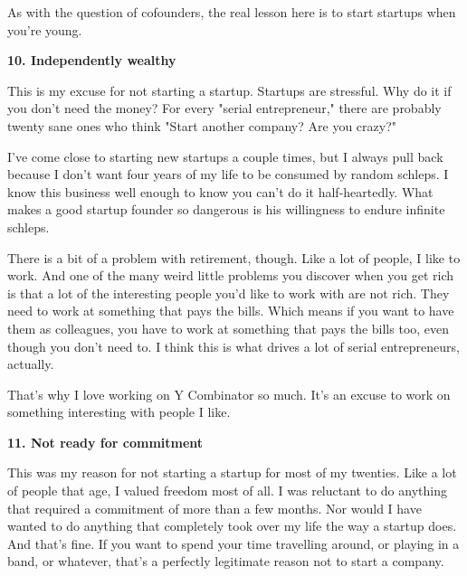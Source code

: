 As with the question of cofounders, the
                    real lesson here is to start startups when you're young.

\textbf{10. Independently wealthy}

This is my excuse for not starting a startup.
                    Startups are stressful. Why do it if you don't need the
                    money? For every "serial entrepreneur," there are probably
                    twenty sane ones who think "Start another company? Are you
                    crazy?"

I've come close to starting new startups
                    a couple times, but I always pull back because I don't want
                    four years of my life to be consumed by random schleps. I
                    know this business well enough to know you can't do it
                    half-heartedly. What makes a good startup founder so
                    dangerous is his willingness to endure infinite schleps.

There
                    is a bit of a problem with retirement, though. Like a lot of
                    people, I like to work. And one of the many weird little
                    problems you discover when you get rich is that a lot of the
                    interesting people you'd like to work with are not rich.
                    They need to work at something that pays the bills. Which
                    means if you want to have them as colleagues, you have to
                    work at something that pays the bills too, even though you
                    don't need to. I think this is what drives a lot of serial
                    entrepreneurs, actually.

That's why I love
                    working on Y Combinator so much. It's an excuse to work on
                    something interesting with people I like.

\textbf{11. Not ready for commitment}

This was my reason for not starting a startup
                    for most of my twenties. Like a lot of people that age, I
                    valued freedom most of all. I was reluctant to do anything
                    that required a commitment of more than a few months. Nor
                    would I have wanted to do anything that completely took over
                    my life the way a startup does. And that's fine. If you want
                    to spend your time travelling around, or playing in a band,
                    or whatever, that's a perfectly legitimate reason not to
                    start a company.

